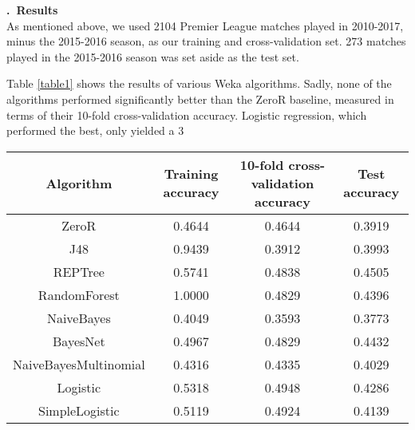 \documentclass[a4paper,11pt,table]{article}
\renewcommand{\section}[1]{\stepcounter{section}\noindent\textbf{\arabic{section}.~#1}\\}
\begin{document}
\section{Results}

As mentioned above, we used 2104 Premier League matches played in 2010-2017, minus the 2015-2016 season, as our training and cross-validation set. 273 matches played in the 2015-2016 season was set aside as the test set.

Table \ref{table1} shows the results of various Weka algorithms. Sadly, none of the algorithms performed significantly better than the ZeroR baseline, measured in terms of their 10-fold cross-validation accuracy. Logistic regression, which performed the best, only yielded a 3%

\begin{center}
    \begin{tabular}{|c|c|c|c|}
        \hline
        Algorithm               &   Training accuracy  &   10-fold cross-validation accuracy  &   Test accuracy \\
        \hline
        ZeroR                   &   0.4644          &   0.4644      &   0.3919 \\
        \hline
        J48                     &   0.9439          &   0.3912      &   0.3993 \\
        \hline
        REPTree                 &   0.5741          &   0.4838      &   \cellcolor{red!25}0.4505 \\
        \hline
        RandomForest            &   \cellcolor{red!25}1.0000          &   0.4829      &   0.4396 \\
        \hline
        NaiveBayes              &   0.4049          &   0.3593      &   0.3773 \\
        \hline
        BayesNet                &   0.4967          &   0.4829      &   0.4432 \\
        \hline
        NaiveBayesMultinomial   &   0.4316          &   0.4335      &   0.4029 \\
        \hline
        Logistic                &   0.5318          &   \cellcolor{red!25}0.4948      &   0.4286 \\
        \hline
        SimpleLogistic          &   0.5119          &   0.4924      &   0.4139 \\
        \hline
    \end{tabular}
\end{center}
\end{document}
